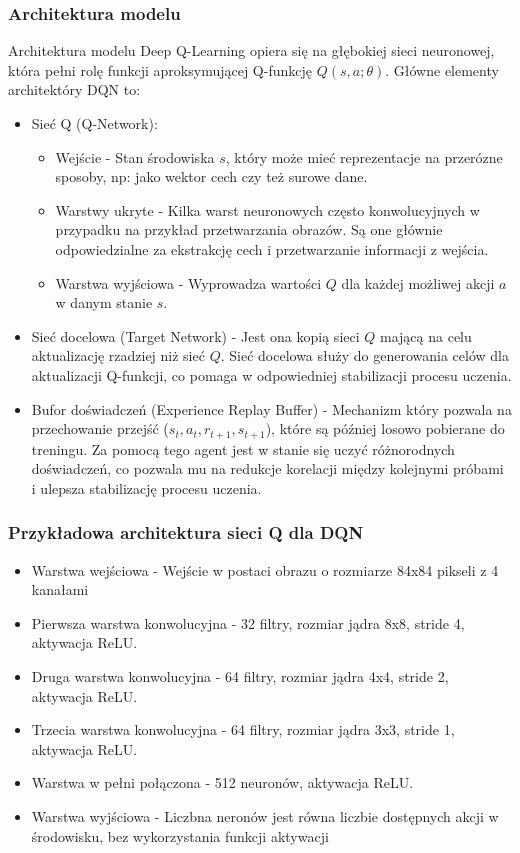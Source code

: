 \documentclass[a4paper, 12pt]{article}
\begin{document}
    \subsubsection{Architektura modelu}
    Architektura modelu Deep Q-Learning opiera się na głębokiej sieci neuronowej, która pełni rolę funkcji aproksymującej 
    Q-funkcję \( Q(s,a;\theta) \). Główne elementy architektóry DQN to:
    \begin{itemize}
        \item Sieć Q (Q-Network):
        \begin{itemize}
            \item Wejście - Stan środowiska \( s \), który może mieć reprezentacje na przerózne sposoby, np: jako wektor cech 
            czy też surowe dane.
            \item Warstwy ukryte - Kilka warst neuronowych często konwolucyjnych w przypadku na przykład przetwarzania obrazów.
            Są one głównie odpowiedzialne za ekstrakcję cech i przetwarzanie informacji z wejścia.
            \item Warstwa wyjściowa - Wyprowadza wartości \( Q \) dla każdej możliwej akcji \( a \) w danym stanie \( s \).
        \end{itemize}
        \item Sieć docelowa (Target Network) - Jest ona kopią sieci \( Q \) mającą na celu aktualizację rzadziej niż sieć \( Q \).
        Sieć docelowa służy do generowania celów dla aktualizacji Q-funkcji, co pomaga w odpowiedniej stabilizacji procesu uczenia.
        \item Bufor doświadczeń (Experience Replay Buffer) - Mechanizm który pozwala na przechowanie przejść (\( s_t, a_t, r_{t+1}, s_{t+1} \)),
        które są później losowo pobierane do treningu. Za pomocą tego agent jest w stanie się uczyć różnorodnych doświadczeń,
        co pozwala mu na redukcje korelacji między kolejnymi próbami i ulepsza stabilizację procesu uczenia.
    \end{itemize}
    \subsubsection{Przykładowa architektura sieci Q dla DQN}
    \begin{itemize}
        \item Warstwa wejściowa - Wejście w postaci obrazu o rozmiarze 84x84 pikseli z 4 kanałami
        \item Pierwsza warstwa konwolucyjna - 32 filtry, rozmiar jądra 8x8, stride 4, aktywacja ReLU.
        \item Druga warstwa konwolucyjna - 64 filtry, rozmiar jądra 4x4, stride 2, aktywacja ReLU.
        \item Trzecia warstwa konwolucyjna - 64 filtry, rozmiar jądra 3x3, stride 1, aktywacja ReLU.
        \item Warstwa w pełni połączona - 512 neuronów, aktywacja ReLU.
        \item Warstwa wyjściowa - Liczbna neronów jest równa liczbie dostępnych akcji w środowisku, bez wykorzystania funkcji aktywacji
    \end{itemize}
\end{document}
